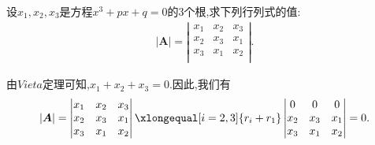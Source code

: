 \documentclass[lang=cn,newtx,10pt,scheme=chinese]{elegantbook}
\begin{document}
\begin{exercise}
    设$x_1,x_2,x_3$是方程$x^3+px+q=0$的3个根,求下列行列式的值:
    \begin{gather}
        \left| \boldsymbol{A} \right|=\left| \begin{matrix}
            x_1&		x_2&		x_3\\
            x_2&		x_3&		x_1\\
            x_3&		x_1&		x_2\\
        \end{matrix} \right|.
        \nonumber
    \end{gather}
    \begin{solution}
        由$Vieta$定理可知,$x_1+x_2+x_3=0$.因此,我们有
        \begin{equation}
            \begin{split}
                \left| \boldsymbol{A} \right|=\left| \begin{matrix}
                    x_1&		x_2&		x_3\\
                    x_2&		x_3&		x_1\\
                    x_3&		x_1&		x_2\\
                \end{matrix} \right|\xlongequal[i=2,3]{r_i+r_1}\left| \begin{matrix}
                    0&		0&		0\\
                    x_2&		x_3&		x_1\\
                    x_3&		x_1&		x_2\\
                \end{matrix} \right|=0.
            \end{split}
            \nonumber
        \end{equation}
    \end{solution}
\end{exercise}
\end{document}
